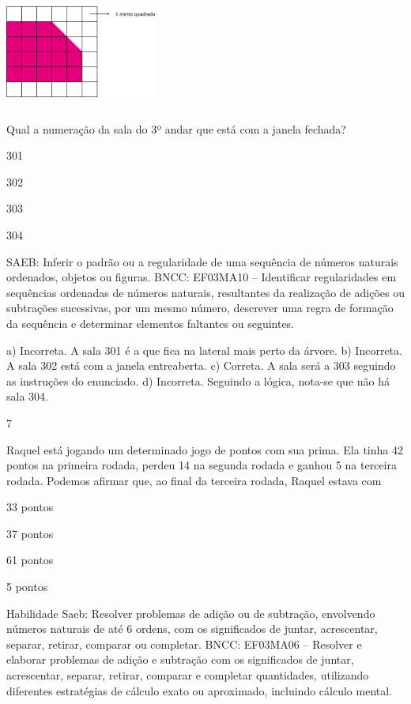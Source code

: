 \begin{multicols}{2}
\begin{enumerate}
{%

\includegraphics[width=1.96154in,height=1.44792in]{media/image108.png}

Qual a numeração da sala do 3º andar que está com a janela fechada?

\begin{escolha}
\item
  301
\item
  302
\item
  303
\item
  304
\end{escolha}

SAEB: Inferir o padrão ou a regularidade de uma sequência de
números naturais ordenados, objetos ou figuras.
BNCC: EF03MA10 -- Identificar regularidades em sequências ordenadas de números naturais,
resultantes da realização de adições ou subtrações sucessivas, por um mesmo número,
descrever uma regra de formação da sequência e determinar elementos faltantes ou seguintes.

a) Incorreta. A sala 301 é a que fica na lateral mais perto da árvore.
b) Incorreta. A sala 302 está com a janela entreaberta.
c) Correta. A sala será a 303 seguindo as instruções do enunciado.
d) Incorreta. Seguindo a lógica, nota-se que não há sala 304.

\num{7}

Raquel está jogando um determinado jogo de pontos com sua prima. Ela
tinha 42 pontos na primeira rodada, perdeu 14 na segunda rodada e ganhou
5 na terceira rodada. Podemos afirmar que, ao final da terceira rodada, Raquel estava com

\begin{escolha}
\item
  33 pontos
\item
  37 pontos
\item
  61 pontos
\item
  5 pontos
\end{escolha}

Habilidade Saeb: Resolver problemas de adição ou de subtração,
envolvendo números naturais de até 6 ordens, com os significados de
juntar, acrescentar, separar, retirar, comparar ou completar.
BNCC: EF03MA06 – Resolver e elaborar problemas de adição e subtração com os significados de
juntar, acrescentar, separar, retirar, comparar e completar quantidades, utilizando diferentes
estratégias de cálculo exato ou aproximado, incluindo cálculo mental.


}
\end{enumerate}
\end{multicols}
